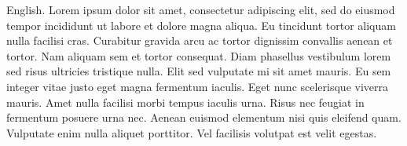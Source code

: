 English.
Lorem ipsum dolor sit amet, consectetur adipiscing elit, sed do eiusmod tempor incididunt ut labore et dolore magna aliqua.
Eu tincidunt tortor aliquam nulla facilisi cras.
Curabitur gravida arcu ac tortor dignissim convallis aenean et tortor.
Nam aliquam sem et tortor consequat.
Diam phasellus vestibulum lorem sed risus ultricies tristique nulla.
Elit sed vulputate mi sit amet mauris.
Eu sem integer vitae justo eget magna fermentum iaculis.
Eget nunc scelerisque viverra mauris.
Amet nulla facilisi morbi tempus iaculis urna.
Risus nec feugiat in fermentum posuere urna nec.
Aenean euismod elementum nisi quis eleifend quam.
Vulputate enim nulla aliquet porttitor.
Vel facilisis volutpat est velit egestas.
